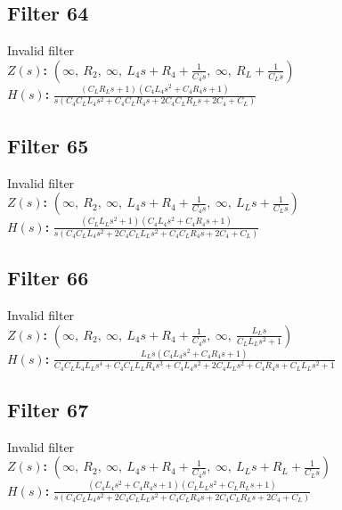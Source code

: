 \documentclass{article}
\begin{document}
\subsection*{Filter 64}
Invalid filter \\ 
\textbf{$Z(s)$:} $\left( \infty, \  R_{2}, \  \infty, \  L_{4} s + R_{4} + \frac{1}{C_{4} s}, \  \infty, \  R_{L} + \frac{1}{C_{L} s}\right)$ \\ 
\textbf{$H(s)$:} $\frac{\left(C_{L} R_{L} s + 1\right) \left(C_{4} L_{4} s^{2} + C_{4} R_{4} s + 1\right)}{s \left(C_{4} C_{L} L_{4} s^{2} + C_{4} C_{L} R_{4} s + 2 C_{4} C_{L} R_{L} s + 2 C_{4} + C_{L}\right)}$ \\ 
\subsection*{Filter 65}
Invalid filter \\ 
\textbf{$Z(s)$:} $\left( \infty, \  R_{2}, \  \infty, \  L_{4} s + R_{4} + \frac{1}{C_{4} s}, \  \infty, \  L_{L} s + \frac{1}{C_{L} s}\right)$ \\ 
\textbf{$H(s)$:} $\frac{\left(C_{L} L_{L} s^{2} + 1\right) \left(C_{4} L_{4} s^{2} + C_{4} R_{4} s + 1\right)}{s \left(C_{4} C_{L} L_{4} s^{2} + 2 C_{4} C_{L} L_{L} s^{2} + C_{4} C_{L} R_{4} s + 2 C_{4} + C_{L}\right)}$ \\ 
\subsection*{Filter 66}
Invalid filter \\ 
\textbf{$Z(s)$:} $\left( \infty, \  R_{2}, \  \infty, \  L_{4} s + R_{4} + \frac{1}{C_{4} s}, \  \infty, \  \frac{L_{L} s}{C_{L} L_{L} s^{2} + 1}\right)$ \\ 
\textbf{$H(s)$:} $\frac{L_{L} s \left(C_{4} L_{4} s^{2} + C_{4} R_{4} s + 1\right)}{C_{4} C_{L} L_{4} L_{L} s^{4} + C_{4} C_{L} L_{L} R_{4} s^{3} + C_{4} L_{4} s^{2} + 2 C_{4} L_{L} s^{2} + C_{4} R_{4} s + C_{L} L_{L} s^{2} + 1}$ \\ 
\subsection*{Filter 67}
Invalid filter \\ 
\textbf{$Z(s)$:} $\left( \infty, \  R_{2}, \  \infty, \  L_{4} s + R_{4} + \frac{1}{C_{4} s}, \  \infty, \  L_{L} s + R_{L} + \frac{1}{C_{L} s}\right)$ \\ 
\textbf{$H(s)$:} $\frac{\left(C_{4} L_{4} s^{2} + C_{4} R_{4} s + 1\right) \left(C_{L} L_{L} s^{2} + C_{L} R_{L} s + 1\right)}{s \left(C_{4} C_{L} L_{4} s^{2} + 2 C_{4} C_{L} L_{L} s^{2} + C_{4} C_{L} R_{4} s + 2 C_{4} C_{L} R_{L} s + 2 C_{4} + C_{L}\right)}$ \\ 
\end{document}

